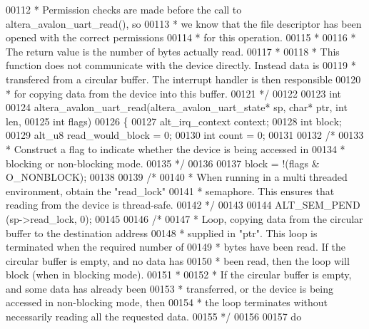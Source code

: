 \begin{DoxyCode}
00112 \textcolor{comment}{ * Permission checks are made before the call to altera\_avalon\_uart\_read(), so}
00113 \textcolor{comment}{ * we know that the file descriptor has been opened with the correct permissions}
00114 \textcolor{comment}{ * for this operation.}
00115 \textcolor{comment}{ *}
00116 \textcolor{comment}{ * The return value is the number of bytes actually read.}
00117 \textcolor{comment}{ *}
00118 \textcolor{comment}{ * This function does not communicate with the device directly. Instead data is}
00119 \textcolor{comment}{ * transfered from a circular buffer. The interrupt handler is then responsible}
00120 \textcolor{comment}{ * for copying data from the device into this buffer.}
00121 \textcolor{comment}{ */}
00122 
00123 \textcolor{keywordtype}{int} 
00124 altera_avalon_uart_read(altera_avalon_uart_state* sp, \textcolor{keywordtype}{char}* ptr, \textcolor{keywordtype}{int} len,
00125   \textcolor{keywordtype}{int} flags)
00126 \{
00127   alt_irq_context context;
00128   \textcolor{keywordtype}{int}             block;
00129   alt_u8          read\_would\_block = 0;
00130   \textcolor{keywordtype}{int}             count = 0;
00131 
00132   \textcolor{comment}{/* }
00133 \textcolor{comment}{   * Construct a flag to indicate whether the device is being accessed in}
00134 \textcolor{comment}{   * blocking or non-blocking mode.}
00135 \textcolor{comment}{   */}
00136 
00137   block = !(flags & O\_NONBLOCK);
00138 
00139   \textcolor{comment}{/*}
00140 \textcolor{comment}{   * When running in a multi threaded environment, obtain the "read\_lock"}
00141 \textcolor{comment}{   * semaphore. This ensures that reading from the device is thread-safe.}
00142 \textcolor{comment}{   */}
00143 
00144   ALT_SEM_PEND (sp->read\_lock, 0);
00145 
00146   \textcolor{comment}{/*}
00147 \textcolor{comment}{   * Loop, copying data from the circular buffer to the destination address}
00148 \textcolor{comment}{   * supplied in "ptr". This loop is terminated when the required number of}
00149 \textcolor{comment}{   * bytes have been read. If the circular buffer is empty, and no data has}
00150 \textcolor{comment}{   * been read, then the loop will block (when in blocking mode).}
00151 \textcolor{comment}{   *}
00152 \textcolor{comment}{   * If the circular buffer is empty, and some data has already been }
00153 \textcolor{comment}{   * transferred, or the device is being accessed in non-blocking mode, then}
00154 \textcolor{comment}{   * the loop terminates without necessarily reading all the requested data.}
00155 \textcolor{comment}{   */}
00156 
00157   \textcolor{keywordflow}{do}

\end{DoxyCode}
